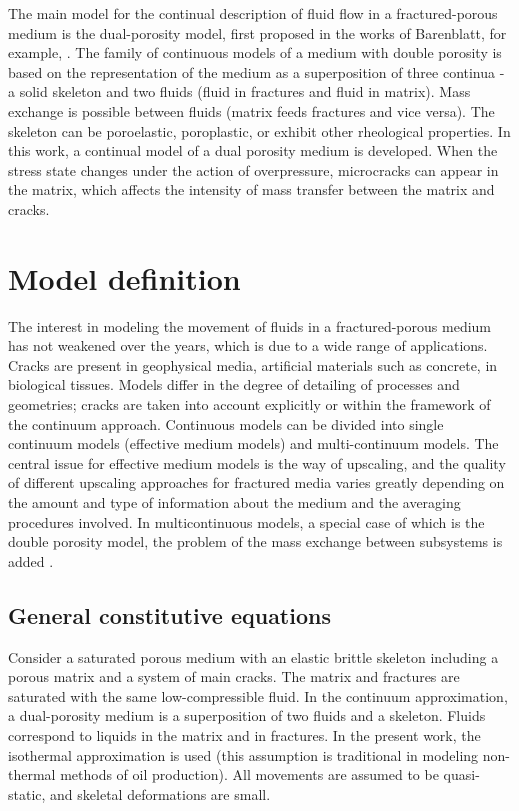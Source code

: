 \documentclass[article,authoryear,jpm]{beg_39}             %
\begin{document}
The main model for the continual description of fluid flow in a fractured-porous medium is the dual-porosity model, first proposed in the works of Barenblatt, for example, \cite{Barenblatt}.
The family of continuous models of a medium with double porosity is based on the representation of the medium as a superposition of three continua - a solid skeleton and two fluids (fluid in fractures and fluid in matrix).
Mass exchange is possible between fluids (matrix feeds fractures and vice versa).
The skeleton can be poroelastic, poroplastic, or exhibit other rheological properties.
In this work, a continual model of a dual porosity medium is developed.
When the stress state changes under the action of overpressure, microcracks can appear in the matrix, which affects the intensity of mass transfer between the matrix and cracks.

\section{Model definition}
\label{sec:1}
The interest in modeling the movement of fluids in a fractured-porous medium has not weakened over the years, which is due to a wide range of applications.
Cracks are present in geophysical media, artificial materials such as concrete, in biological tissues.
Models differ in the degree of detailing of processes and geometries; cracks are taken into account explicitly or within the framework of the continuum approach.
Continuous models can be divided into single continuum models (effective medium models) and multi-continuum models.
The central issue for effective medium models is the way of upscaling, and the quality of different upscaling approaches for fractured media varies greatly depending on the amount and type of information about the medium and the averaging procedures involved.
In multicontinuous models, a special case of which is the double porosity model, the problem of the mass exchange between subsystems is added \cite{Berre}.


\subsection{General constitutive equations}
\label{sec:2}
Consider a saturated porous medium with an elastic brittle skeleton including a porous matrix and a system of main cracks.
The matrix and fractures are saturated with the same low-compressible fluid.
In the continuum approximation, a dual-porosity medium is a superposition of two fluids and a skeleton.
Fluids correspond to liquids in the matrix and in fractures.
In the present work, the isothermal approximation is used (this assumption is traditional in modeling non-thermal methods of oil production).
All movements are assumed to be quasi-static, and skeletal deformations are small.
\end{document}
